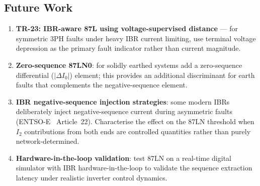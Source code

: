 \documentclass[11pt, a4paper]{article}
\begin{document}
\subsection{Future Work}

\begin{enumerate}
  \item \textbf{TR-23: IBR-aware 87L using voltage-supervised distance} ---
        for symmetric 3PH faults under heavy IBR current limiting, use
        terminal voltage depression as the primary fault indicator rather
        than current magnitude.
  \item \textbf{Zero-sequence 87LN0}: for solidly earthed systems add a
        zero-sequence differential ($|\Delta I_0|$) element; this provides
        an additional discriminant for earth faults that complements the
        negative-sequence element.
  \item \textbf{IBR negative-sequence injection strategies}: some modern
        IBRs deliberately inject negative-sequence current during asymmetric
        faults (ENTSO-E~\cite{ENTSO_RfG} Article~22).  Characterise the
        effect on the 87LN threshold when $I_2$ contributions from both
        ends are controlled quantities rather than purely network-determined.
  \item \textbf{Hardware-in-the-loop validation}: test 87LN on a
        real-time digital simulator with IBR hardware-in-the-loop to
        validate the sequence extraction latency under realistic inverter
        control dynamics.
\end{enumerate}




\end{document}
